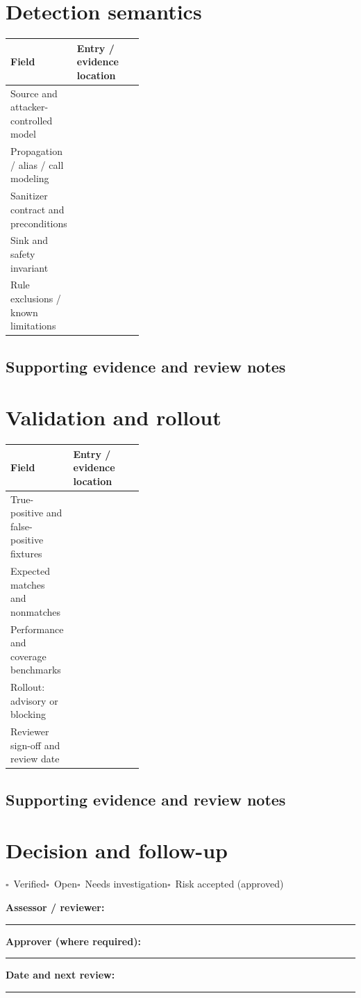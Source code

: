 \documentclass[10pt,letterpaper]{article}
\newcommand{\checkbox}{\(\square\)}
\newcommand{\blankline}{\noindent\rule{\linewidth}{0.35pt}\par\vspace{4pt}}
\newcommand{\writearea}[1]{\par\begin{tcolorbox}[colback=white,colframe=linegray,boxrule=0.5pt,height=#1,sharp corners]\mbox{}\end{tcolorbox}\par}
\begin{document}
\section{Detection semantics}
\begin{tabularx}{\linewidth}{@{}p{0.38\linewidth}Y@{}}
\toprule Field & Entry / evidence location\\\midrule
Source and attacker-controlled model & \\[1.0em]
\midrule
Propagation / alias / call modeling & \\[1.0em]
\midrule
Sanitizer contract and preconditions & \\[1.0em]
\midrule
Sink and safety invariant & \\[1.0em]
\midrule
Rule exclusions / known limitations & \\[1.0em]
\midrule
\end{tabularx}
\subsection{Supporting evidence and review notes}
\writearea{1.45in}
\clearpage
\section{Validation and rollout}
\begin{tabularx}{\linewidth}{@{}p{0.38\linewidth}Y@{}}
\toprule Field & Entry / evidence location\\\midrule
True-positive and false-positive fixtures & \\[1.0em]
\midrule
Expected matches and nonmatches & \\[1.0em]
\midrule
Performance and coverage benchmarks & \\[1.0em]
\midrule
Rollout: advisory or blocking & \\[1.0em]
\midrule
Reviewer sign-off and review date & \\[1.0em]
\midrule
\end{tabularx}
\subsection{Supporting evidence and review notes}
\writearea{1.45in}
\clearpage
\section{Decision and follow-up}
\noindent\checkbox\ Verified\quad\checkbox\ Open\quad\checkbox\ Needs investigation\quad\checkbox\ Risk accepted (approved)\par
\noindent\textbf{Assessor / reviewer:}\par\blankline\textbf{Approver (where required):}\par\blankline\textbf{Date and next review:}\par\blankline
\writearea{1.7in}
\end{document}
